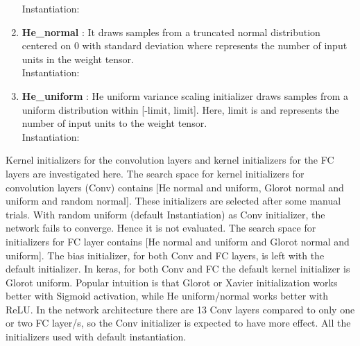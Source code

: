 \begin{enumerate}
Instantiation: 
 \item \textbf{He\_normal} : It draws samples from a truncated normal distribution centered on 0 with standard deviation  where  represents the number of 
input units in the weight tensor.\\
Instantiation: 
 \item \textbf{He\_uniform} : He uniform variance scaling initializer draws samples from a uniform distribution within [-limit, limit]. Here, limit is  and  represents the number
of input units to the weight tensor.\\
Instantiation: 
\end{enumerate}

Kernel initializers for the convolution layers and kernel initializers for the FC layers are investigated here. The search space for kernel initializers for convolution layers (Conv) contains [He normal
and uniform, Glorot normal and uniform and random normal]. These initializers are selected after some manual trials. With random uniform (default Instantiation) as Conv initializer, the 
network fails to converge. Hence it is not evaluated. The search space for initializers for FC layer contains [He normal and uniform and Glorot normal and uniform]. The bias initializer, for both Conv and FC layers, 
is left with the default  initializer.
In keras, for both Conv and FC the default kernel initializer is Glorot uniform. Popular intuition is that Glorot or Xavier initialization works better with Sigmoid activation, while He uniform/normal works better with ReLU. %
 In the network architecture there are 13 Conv layers compared to only one or two FC layer/s, so the Conv initializer is expected to have more effect.
All the initializers used with default instantiation. 

